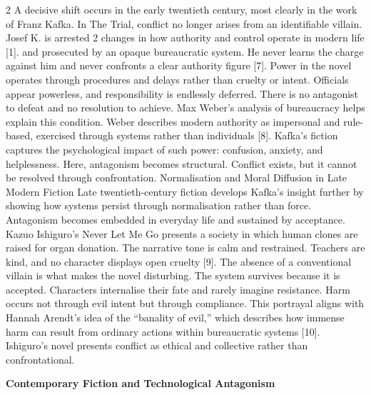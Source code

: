 \documentclass[12pt,a4paper]{article}
\begin{document}
\begin{multicols}{2}
\noindent
A decisive shift occurs in the early twentieth century, most 
clearly in the work of Franz Kafka. In The Trial, conflict no 
longer arises from an identifiable villain. Josef K. is arrested 
2 
changes in how authority and control operate in modern life [1]. 
and prosecuted by an opaque bureaucratic system. He never 
learns the charge against him and never confronts a clear 
authority figure [7]. 
Power in the novel operates through procedures and delays 
rather than cruelty or intent. Officials appear powerless, and 
responsibility is endlessly deferred. There is no antagonist to 
defeat and no resolution to achieve. 
Max Weber’s analysis of bureaucracy helps explain this 
condition. Weber describes modern authority as impersonal and 
rule-based, exercised through systems rather than individuals 
[8]. Kafka’s fiction captures the psychological impact of such 
power: confusion, anxiety, and helplessness. 
Here, antagonism becomes structural. Conflict exists, but it 
cannot be resolved through confrontation. 
Normalisation and Moral Diffusion in Late Modern Fiction 
Late twentieth-century fiction develops Kafka’s insight further 
by showing how systems persist through normalisation rather 
than force. Antagonism becomes embedded in everyday life 
and sustained by acceptance. 
Kazuo Ishiguro’s Never Let Me Go presents a society in which 
human clones are raised for organ donation. The narrative tone 
is calm and restrained. Teachers are kind, and no character 
displays open cruelty [9]. The absence of a conventional villain 
is what makes the novel disturbing. 
The system survives because it is accepted. Characters 
internalise their fate and rarely imagine resistance. Harm occurs 
not through evil intent but through compliance. 
This portrayal aligns with Hannah Arendt’s idea of the 
“banality of evil,” which describes how immense harm can 
result from ordinary actions within bureaucratic systems [10]. 
Ishiguro’s novel presents conflict as ethical and collective 
rather than confrontational. 

\vspace{8pt}
\noindent
\textbf{Contemporary Fiction and Technological Antagonism}


\end{multicols}
\end{document}
